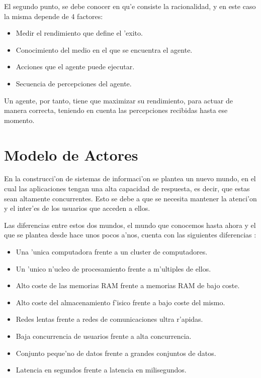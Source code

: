 \documentclass[12pt]{article}
\begin{document}
El segundo punto, se debe conocer en qu'e consiste la racionalidad, y en este caso la misma depende de 4 factores:

\begin{itemize}
	\item Medir el rendimiento que define el 'exito.
	\item Conocimiento del medio en el que se encuentra el agente.
	\item Acciones que el agente puede ejecutar.
	\item Secuencia de percepciones del agente.
\end{itemize}

Un agente, por tanto, tiene que maximizar su rendimiento, para actuar de manera correcta, teniendo en cuenta las
percepciones recibidas hasta ese momento.

\section{Modelo de Actores}
\label{sec:modelos de actores}
En la construcci'on de sistemas de informaci'on se plantea un nuevo mundo, en el cual
las aplicaciones tengan una alta capacidad de respuesta, es decir, que estas sean altamente concurrentes.
Esto se debe a que se necesita mantener la atenci'on y el inter'es de los usuarios que acceden a ellos.

Las diferencias entre estos dos mundos, el mundo que conocemos hasta ahora y el que se plantea
desde hace unos pocos a'nos, cuenta con las siguientes diferencias \cite{RA-HughMcKee}:

\begin{itemize}
	\item Una 'unica computadora frente a un cluster de computadores.
	\item Un 'unico n'ucleo de procesamiento frente a m'ultiples de ellos.
	\item Alto coste de las memorias RAM frente a memorias RAM de bajo coste.
	\item Alto coste del almacenamiento f'isico frente a bajo coste del mismo.
    \item Redes lentas frente a redes de comunicaciones ultra r'apidas.
    \item Baja concurrencia de usuarios frente a alta concurrencia.
    \item Conjunto peque'no de datos frente a grandes conjuntos de datos.
    \item Latencia en segundos frente a latencia en milisegundos.
\end{itemize}
\end{document}
